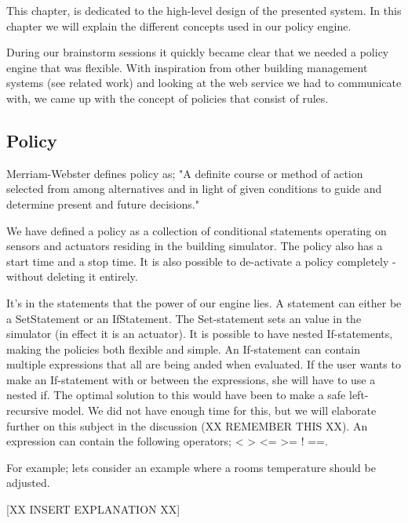 This chapter, is dedicated to the high-level design of the presented system. In this chapter we will explain the different concepts used in our policy engine. 

During our brainstorm sessions it quickly became clear that we needed a policy engine that was flexible. With inspiration from other building management systems (see related work) and looking at the web service we had to communicate with, we came up with the concept of policies that consist of rules.

\subsection{Policy}
Merriam-Webster defines policy as; "A definite course or method of action selected from among alternatives and in light of given conditions to guide and determine present and future decisions."

We have defined a policy as a collection of conditional statements operating on sensors and actuators residing in the building simulator. The policy also has a start time and a stop time. It is also possible to de-activate a policy completely - without deleting it entirely.

It's in the statements that the power of our engine lies. A statement can either be a SetStatement or an IfStatement. The Set-statement sets an value in the simulator (in effect it is an actuator). It is possible to have nested If-statements, making the policies both flexible and simple. An If-statement can contain multiple expressions that all are being anded when evaluated. If the user wants to make an If-statement with or between the expressions, she will have to use a nested if. The optimal solution to this would have been to make a safe left-recursive model. We did not have enough time for this, but we will elaborate further on this subject in the discussion (XX REMEMBER THIS XX). An expression can contain the following operators; < > <= >= ! ==. 

For example; lets consider an example where a rooms temperature should be adjusted.

[XX INSERT EXPLANATION XX]

